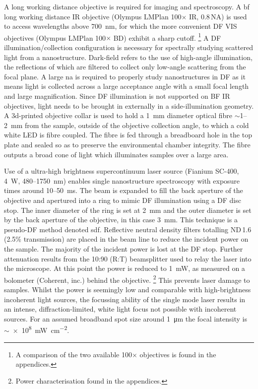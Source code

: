 \documentclass{article}
\begin{document}
A long working distance objective is required for imaging and spectroscopy. A \gls{bf} long working distance IR objective (Olympus LMPlan 100$\times$ IR, 0.8\,NA) is used to access wavelengths above \SI{700}{nm}, for which the more convenient DF VIS objectives (Olympus LMPlan 100$\times$ BD) exhibit a sharp cutoff.%
\footnote{A comparison of the two available 100$\times$ objectives is found in the appendices.}
A DF illumination/collection configuration is necessary for spectrally studying scattered light from a nanostructure. Dark-field refers to the use of high-angle illumination, the reflections of which are filtered to collect only low-angle scattering from the focal plane. A large \gls{na} is required to properly study nanostructures in DF as it means light is collected across a large acceptance angle with a small focal length and large magnification. Since DF illumination is not supported on BF IR objectives, light needs to be brought in externally in a side-illumination geometry. A 3d-printed objective collar is used to hold a \SI{1}{mm} diameter optical fibre $\sim$1--\SI{2}{mm} from the sample, outside of the objective collection angle, to which a cold white LED is fibre coupled. The fibre is fed through a breadboard hole in the top plate and sealed so as to preserve the environmental chamber integrity. The fibre outputs a broad cone of light which illuminates samples over a large area.

Use of a ultra-high brightness supercontinuum laser source (Fianium SC-400, \SI{4}{W}, 480--\SI{1750}{nm}) enables single nanostructure spectroscopy with exposure times around 10--\SI{50}{ms}. The beam is expanded to fill the back aperture of the objective and apertured into a ring to mimic DF illumination using a DF disc stop. The inner diameter of the ring is set at \SI{2}{mm} and the outer diameter is set by the back aperture of the objective, in this case \SI{3}{mm}. This technique is a pseudo-DF method denoted \gls{sdf}. %
Reflective neutral density filters totalling ND\,1.6 (2.5\% transmission) are placed in the beam line to reduce the incident power on the sample. The majority of the incident power is lost at the DF stop. Further attenuation results from the 10:90 (R:T) beamsplitter used to relay the laser into the microscope. At this point the power is reduced to \SI{1}{mW}, as measured on a bolometer (Coherent, inc.) behind the objective.%
\footnote{Power characterisation found in the appendices.}
This prevents laser damage to samples. Whilst the power is seemingly low and comparable with high-brightness incoherent light sources, the focussing ability of the single mode laser results in an intense, diffraction-limited, white light focus not possible with incoherent sources. For an assumed broadband spot size around \SI{1}{\micro\metre} the focal intensity is $\sim${\SI{e8}{\milli\watt\per\centi\metre\squared}}.
\end{document}
